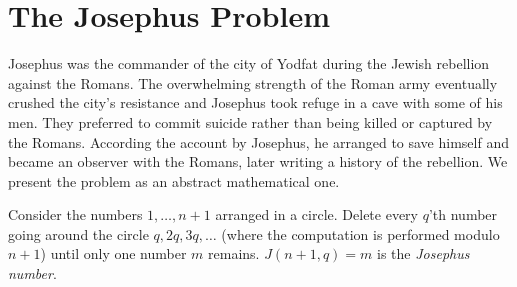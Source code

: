 
\section{The Josephus Problem}\label{s.josephus}

Josephus was the commander of the city of Yodfat during the Jewish rebellion against the Romans. The overwhelming strength of the Roman army eventually crushed the city's resistance and Josephus took refuge in a cave with some of his men. They preferred to commit suicide rather than being killed or captured by the Romans. According the account by Josephus, he arranged to save himself and became an observer with the Romans, later writing a history of the rebellion. We present the problem as an abstract  mathematical one.

\begin{definition}
Consider the numbers $1,\ldots,n\!+\!1$ arranged in a circle. Delete every $q$'th number going around the circle $q, 2q, 3q, \ldots$ (where the computation is performed modulo $n\!+\!1$) until only one number $m$ remains. $J(n+1,q)=m$ is the \emph{Josephus number}.
\end{definition}

